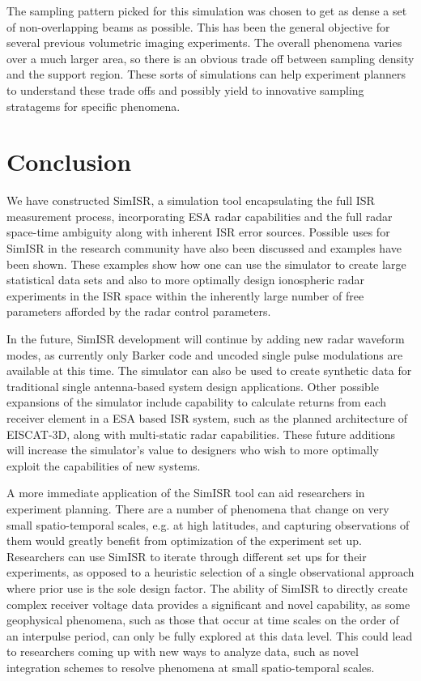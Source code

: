 \documentclass[draft,ras]{agutex}
\begin{document}
\begin{article}
The sampling pattern picked for this simulation was chosen to get as dense a set of non-overlapping beams as possible.  This has been the general objective for several previous volumetric imaging experiments. The overall phenomena varies over a much larger area, so there is an obvious trade off between sampling density and the support region. These sorts of simulations can help experiment planners to understand these trade offs and possibly yield to innovative sampling stratagems for specific phenomena. 

\section{Conclusion}
We have constructed SimISR, a simulation tool encapsulating the full ISR measurement process, incorporating ESA radar capabilities and the full radar space-time ambiguity along with inherent ISR error sources. Possible uses for SimISR in the research community have also been discussed and examples have been shown. These examples show how one can use the simulator to create large statistical data sets and also to more optimally design ionospheric radar experiments in the ISR space within the inherently large number of free parameters afforded by the radar control parameters. 

In the future, SimISR development will continue by adding new radar waveform modes, as currently only Barker code and uncoded single pulse modulations are available at this time. The simulator can also be used to create synthetic data for traditional single antenna-based system design applications. Other possible expansions of the simulator include capability to calculate returns from each receiver element in a ESA based ISR system, such as the planned architecture of EISCAT-3D, along with multi-static radar capabilities. These future additions will increase the simulator's value to designers who wish to more optimally exploit the capabilities of new systems. 

A more immediate application of the SimISR tool can aid researchers in experiment planning. There are a number of phenomena that change on very small spatio-temporal scales, e.g. at high latitudes, and capturing observations of them would greatly benefit from optimization of the experiment set up. Researchers can use SimISR to iterate through different set ups for their experiments, as opposed to a heuristic selection of a single observational approach where prior use is the sole design factor. The ability of SimISR to directly create complex receiver voltage data provides a significant and novel capability, as some geophysical phenomena, such as those that occur at time scales on the order of an interpulse period, can only be fully explored at this data level. This could lead to researchers coming up with new ways to analyze data, such as novel integration schemes to resolve phenomena at small spatio-temporal scales.


\end{article}
\end{document}
